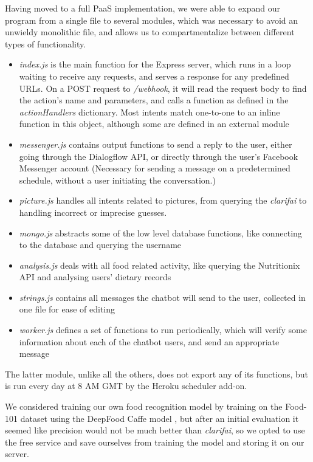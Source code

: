Having moved to a full PaaS implementation, we were able to expand our program from a single file to several modules, which was necessary to avoid an unwieldy monolithic file, and allows us to compartmentalize between different types of functionality.
\begin{itemize}
  \item \textit{index.js} is the main function for the Express server, which runs in a loop waiting to receive any requests, and serves a response for any predefined URLs. On a POST request to \textit{/webhook}, it will read the request body to find the action's name and parameters, and calls a function as defined in the \textit{actionHandlers} dictionary. Most intents match one-to-one to an inline function in this object, although some are defined in an external module
  \item \textit{messenger.js} contains output functions to send a reply to the user, either going through the Dialogflow API, or directly through the user's Facebook Messenger account (Necessary for sending a message on a predetermined schedule, without a user initiating the conversation.)
  \item \textit{picture.js} handles all intents related to pictures, from querying the \textit{clarifai} to handling incorrect or imprecise guesses.
  \item \textit{mongo.js} abstracts some of the low level database functions, like connecting to the database and querying the username
  \item \textit{analysis.js} deals with all food related activity, like querying the Nutritionix API and analysing users' dietary records
  \item \textit{strings.js} contains all messages the chatbot will send to the user, collected in one file for ease of editing
  \item \textit{worker.js} defines a set of functions to run periodically, which will verify some information about each of the chatbot users, and send an appropriate message
\end{itemize}
The latter module, unlike all the others, does not export any of its functions, but is run every day at 8 AM GMT by the Heroku scheduler add-on.

We considered training our own food recognition model by training on the Food-101 dataset using the DeepFood Caffe model \cite{liu2016deepfood}, but after an initial evaluation it seemed like precision would not be much better than \textit{clarifai}, so we opted to use the free service and save ourselves from training the model and storing it on our server.
